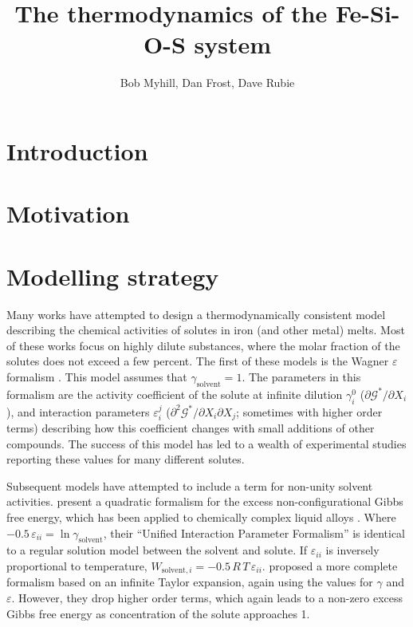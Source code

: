 \documentclass[11pt,a4paper,english]{article}
\title{The thermodynamics of the Fe-Si-O-S system}
\author{Bob Myhill, Dan Frost, Dave Rubie}
\begin{document}
\maketitle

\section{Introduction}


\section{Motivation}

\section{Modelling strategy}
Many works have attempted to design a thermodynamically consistent model describing the chemical activities of solutes in iron (and other metal) melts. Most of these works focus on highly dilute substances, where the molar fraction of the solutes does not exceed a few percent. The first of these models is the Wagner $\varepsilon$ formalism \citep{Wagner1952}. This model assumes that $\gamma_{\textrm{solvent}} = 1$. The parameters in this formalism are the activity coefficient of the solute at infinite dilution $\gamma_i^0$ ($\partial \mathcal G^* / \partial X_i$), and interaction parameters $\varepsilon_i^j$ ($\partial^2 \mathcal G^* / \partial X_i \partial X_j$; sometimes with higher order terms) describing how this coefficient changes with small additions of other compounds. The success of this model has led to a wealth of experimental studies reporting these values for many different solutes. 

Subsequent models have attempted to include a term for non-unity solvent activities. \cite{BP1990} present a quadratic formalism for the excess non-configurational Gibbs free energy, which has been applied to chemically complex liquid alloys \citep{BB1995}. Where $-0.5\, \varepsilon_{ii} = \ln \gamma_{\textrm{solvent}}$, their ``Unified Interaction Parameter Formalism'' is identical to a regular solution model between the solvent and solute. If $\varepsilon_{ii}$ is inversely proportional to temperature, $W_{\textrm{solvent}, i} = -0.5\, R\, T\,  \varepsilon_{ii}$. \cite{Ma2001} proposed a more complete formalism based on an infinite Taylor expansion, again using the values for $\gamma$ and $\varepsilon$. However, they drop higher order terms, which again leads to a non-zero excess Gibbs free energy as concentration of the solute approaches 1.
\end{document}
